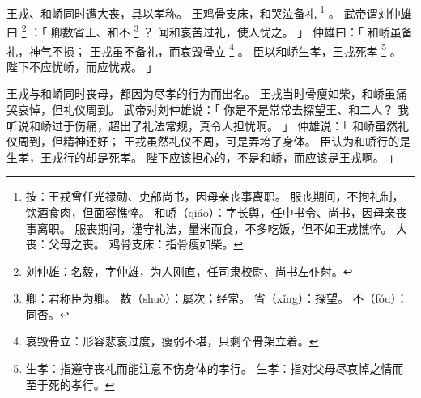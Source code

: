 
\switchcolumn*[\section{}]

王戎、和峤同时遭大丧，具以孝称。
王鸡骨支床，和哭泣备礼%
\footnote{%
    按：王戎曾任光禄勋、吏部尚书，因母亲丧事离职。
        服丧期间，不拘礼制，饮酒食肉，但面容憔悴。
    和峤（qiáo）：字长舆，任中书令、尚书，因母亲丧事离职。
                  服丧期间，谨守礼法，量米而食，不多吃饭，但不如王戎憔悴。
    大丧：父母之丧。
    鸡骨支床：指骨瘦如柴。
}%
。
武帝谓刘仲雄曰%
\footnote{%
    刘仲雄：名毅，字仲雄，为人刚直，任司隶校尉、尚书左仆射。
}%
：「
    卿数省王、和不%
    \footnote{%
        卿：君称臣为卿。
        数（shuò）：屡次；经常。
        省（xǐng）：探望。
        不（fǒu）：同否。
    }%
    ？
    闻和哀苦过礼，使人忧之。
」
仲雄曰：「
    和峤虽备礼，神气不损；
    王戎虽不备礼，而哀毁骨立%
    \footnote{%
        哀毁骨立：形容悲哀过度，瘦弱不堪，只剩个骨架立着。
    }%
    。
    臣以和峤生孝，王戎死孝%
    \footnote{%
        生孝：指遵守丧礼而能注意不伤身体的孝行。
        生孝：指对父母尽哀悼之情而至于死的孝行。
    }%
    。
    陛下不应忧峤，而应忧戎。
」

\switchcolumn

王戎与和峤同时丧母，都因为尽孝的行为而出名。
王戎当时骨瘦如柴，和峤虽痛哭哀悼，但礼仪周到。
武帝对刘仲雄说：「
    你是不是常常去探望王、和二人？
    我听说和峤过于伤痛，超出了礼法常规，真令人担忧啊。
」
仲雄说：「
    和峤虽然礼仪周到，但精神还好；
    王戎虽然礼仪不周，可是弄垮了身体。
    臣认为和峤行的是生孝，王戎行的却是死孝。
    陛下应该担心的，不是和峤，而应该是王戎啊。
」

